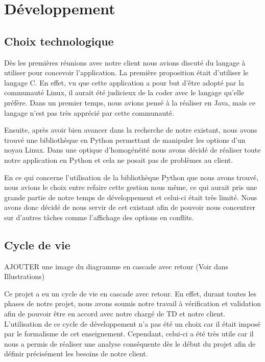 \documentclass[16pts]{report}
\begin{document}

\nocite{*}

\chapter{Développement}
\label{cha:Développement}

\section{Choix technologique}
\label{sec:Choix technologique}

Dès les premières réunions avec notre client nous avions discuté du langage à 
utiliser pour concevoir l'application. La première proposition était d'utiliser 
le langage C. En effet, vu que cette application a pour but d'être adopté par 
la communauté Linux, il aurait été judicieux de la coder avec le langage 
qu'elle préfère. Dans un premier temps, nous avions pensé à la réaliser 
en Java, mais ce langage n'est pas très apprécié par cette communauté.

Ensuite, après avoir bien avancer dans la recherche de notre existant, nous 
avons trouvé une bibliothèque en Python permettant de manipuler les options 
d'un noyau Linux. Dans une optique d'homogénéité nous avons décidé de réaliser 
toute notre application en Python et cela ne posait pas de problèmes au client.

En ce qui concerne l'utilisation de la bibliothèque Python que nous avons 
trouvé, nous avions le choix entre refaire cette gestion nous même, ce qui 
aurait pris une grande partie de notre temps de développement et celui-ci 
était très limité. Nous avons donc décidé de nous servir de cet existant 
afin de pouvoir nous concentrer sur d'autres tâches comme l'affichage 
des options en conflits.

\section{Cycle de vie}
\label{sec:Cycle de vie}

AJOUTER une image du diagramme en cascade avec retour (Voir dans Illustrations)

Ce projet a eu un cycle de vie en cascade avec retour. En effet, durant toutes 
les phases de notre projet, nous avons soumis notre travail à vérification 
et validation afin de pouvoir être en accord avec notre chargé de TD et notre 
client. L'utilisation de ce cycle de développement n'a pas été un choix car 
il était imposé par le formalisme de cet enseignement. Cependant, celui-ci a 
été très utile car il nous a permis de réaliser une analyse conséquente dès 
le début du projet afin de définir précisément les besoins de notre client.
\end{document}
